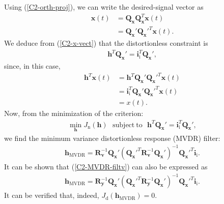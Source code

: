 \documentclass[10pt,pdflatex,headrule,landscape]{beamer}
\begin{document}
\begin{frame}[allowframebreaks]
Using (\ref{C2-orth-proj}), we can write the desired-signal vector as
\begin{align}
\label{C2-x-vect}
 \mathbf{x}(t) &= \mathbf{Q}_{\mathbf{x}} \mathbf{Q}_{\mathbf{x}}^T \mathbf{x}(t) \\
 &= \mathbf{Q}_{\mathbf{x}}' \mathbf{Q}_{\mathbf{x}}'^T \mathbf{x}(t). \nonumber
\end{align}
We deduce from (\ref{C2-x-vect}) that the distortionless constraint is
\begin{eqnarray}
\label{C2-const-M}
 \mathbf{h}^T \mathbf{Q}_{\mathbf{x}}' = \mathbf{i}_{\mathrm{i}}^T \mathbf{Q}_{\mathbf{x}}',
\end{eqnarray}
since, in this case,
\begin{align}
 \mathbf{h}^T \mathbf{x}(t) &= \mathbf{h}^T \mathbf{Q}_{\mathbf{x}}' \mathbf{Q}_{\mathbf{x}}'^T \mathbf{x}(t) \\
 &= \mathbf{i}_{\mathrm{i}}^T \mathbf{Q}_{\mathbf{x}}' \mathbf{Q}_{\mathbf{x}}'^T \mathbf{x}(t) \nonumber \\
 &= x(t) . \nonumber
\end{align}
Now, from the minimization of the criterion:
\begin{eqnarray}
\label{C2-crit-MVDR}
 \min_{ \mathbf{h} } J_{\mathrm{n}}\left( \mathbf{h} \right) \ \ \
 \mathrm{subject \ to} \ \ \  \mathbf{h}^T \mathbf{Q}_{\mathbf{x}}' = \mathbf{i}_{\mathrm{i}}^T \mathbf{Q}_{\mathbf{x}}',
\end{eqnarray}
we find the minimum variance distortionless response (MVDR) filter:
\begin{eqnarray}
\label{C2-MVDR-filtv}
 \mathbf{h}_{\mathrm{MVDR}} =
 \mathbf{R}_{\mathbf{v}}^{-1} \mathbf{Q}_{\mathbf{x}}' \left( \mathbf{Q}_{\mathbf{x}}'^T
 \mathbf{R}_{\mathbf{v}}^{-1} \mathbf{Q}_{\mathbf{x}}' \right)^{-1} \mathbf{Q}_{\mathbf{x}}'^T \mathbf{i}_{\mathrm{i}} .
\end{eqnarray}
It can be shown that (\ref{C2-MVDR-filtv}) can also be expressed as
\begin{eqnarray}
\label{C2-MVDR-filty}
 \mathbf{h}_{\mathrm{MVDR}} =
 \mathbf{R}_{\mathbf{y}}^{-1} \mathbf{Q}_{\mathbf{x}}' \left( \mathbf{Q}_{\mathbf{x}}'^T
 \mathbf{R}_{\mathbf{y}}^{-1} \mathbf{Q}_{\mathbf{x}}' \right)^{-1} \mathbf{Q}_{\mathbf{x}}'^T \mathbf{i}_{\mathrm{i}} .
\end{eqnarray}
It can be verified that, indeed, $J_{\mathrm{d}} \left( \mathbf{h}_{\mathrm{MVDR}} \right) = 0$.


\end{frame}
\end{document}
